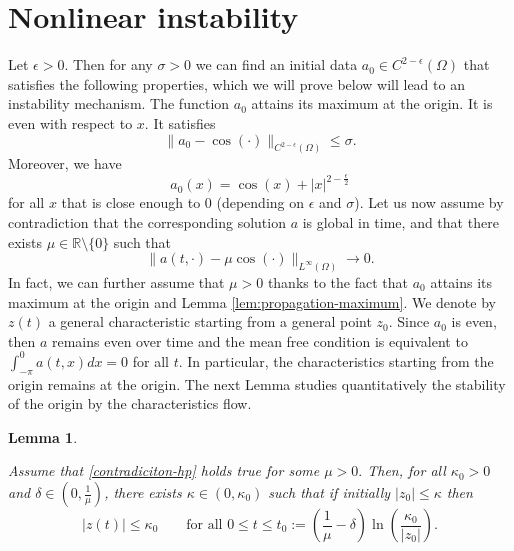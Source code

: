 \documentclass[12pt]{amsart}
\numberwithin{equation}{section}
\def\R{{\mathbb R}}
\numberwithin{equation}{section}
\newtheorem{lem}[thm]{Lemma}
\begin{document}
    
    
    
    
 
 
   \section{Nonlinear instability} \label{sec:instability}

Let $\epsilon>0$. Then for any $\sigma>0$ we can find an initial data $a_0\in C^{2-\epsilon}(\Omega)$ that satisfies the following properties, which we will prove below will lead to an instability mechanism.  The function $a_0$ attains its maximum at the origin.  It is even with respect to $x$. It satisfies
$$
\| a_0-\cos (\cdot)\|_{C^{2-\epsilon}(\Omega)}\leq \sigma.
$$ 
Moreover, we have
\begin{equation} \label{initial-data-instability}
a_0(x)= \cos(x) +|x|^{2-\frac{\epsilon}{2}}
\end{equation}
for all $x$ that is close enough to $0$ (depending on $\epsilon$ and $\sigma$). Let us now assume by contradiction that the corresponding solution $a$ is global in time, and that there exists $\mu\in\R\setminus\{0\}$ such that
\begin{equation} \label{contradiciton-hp}
\|a(t, \cdot)-\mu \cos(\cdot)\|_{L^\infty(\Omega)}\to 0.
\end{equation}
In fact,  we can further assume that $\mu>0$ thanks to the fact that  $a_0$ attains its maximum at the origin and Lemma \ref{lem:propagation-maximum}.
We denote by $z(t)$ a general characteristic starting from a general point $z_0$. Since $a_0$ is even, then $a$ remains even over time and the mean free condition is equivalent to $\int_{-\pi}^0 a(t,x)dx=0$ for all $t$. In particular, the characteristics starting from the origin remains at the origin. The next Lemma studies quantitatively the stability of the origin by the characteristics flow.



\begin{lem} \label{lem:technical-instability}

Assume that \eqref{contradiciton-hp} holds true for some $\mu>0.$ Then, for all $\kappa_0>0$ and $\delta\in(0, \frac{1}{\mu})$,  there exists $\kappa\in(0,  \kappa_0)$ such that if initially $|z_0|\leq \kappa$ then
$$
|z(t)|\leq \kappa_0 \qquad \mbox{for all }0\leq t \leq t_0:= \left(\frac{1}{\mu}-\delta\right)\ln \left(\frac{\kappa_0}{|z_0|} \right).
$$

\end{lem}
\end{document}

